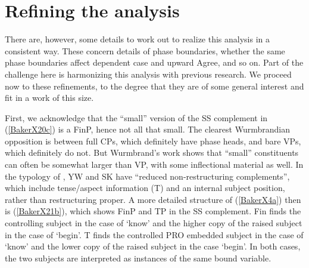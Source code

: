 \documentclass[output=paper]{langscibook}
\begin{document}
\section{Refining the analysis}\label{sec:baker:5}

There are, however, some details to work out to realize this analysis in a consistent way. These concern details of phase boundaries, whether the same phase boundaries affect dependent case and upward Agree, and so on. Part of the challenge here is harmonizing this analysis with previous research. We proceed now to these refinements, to the degree that they are of some general interest and fit in a work of this size.

First, we acknowledge that the “small” version of the SS complement in (\ref{BakerX20c}) is a FinP, hence not all that small. The clearest Wurmbrandian opposition is between full CPs, which definitely have phase heads, and bare VPs, which definitely do not. But Wurmbrand’s work shows that “small” constituents can often be somewhat larger than VP, with some inflectional material as well. In the typology of \citet{wurmbrand2001infinitives}, YW and SK have “reduced non-restructuring complements”, which include tense/aspect information (T) and an internal subject position, rather than restructuring proper. A more detailed structure of (\ref{BakerX4a}) then is (\ref{BakerX21b}), which shows FinP and TP in the SS complement. Fin finds the controlling subject in the case of `know’ and the higher copy of the raised subject in the case of `begin’. T finds the controlled PRO embedded subject in the case of `know’ and the lower copy of the raised subject in the case `begin’. In both cases, the two subjects are interpreted as instances of the same bound variable.
\end{document}
